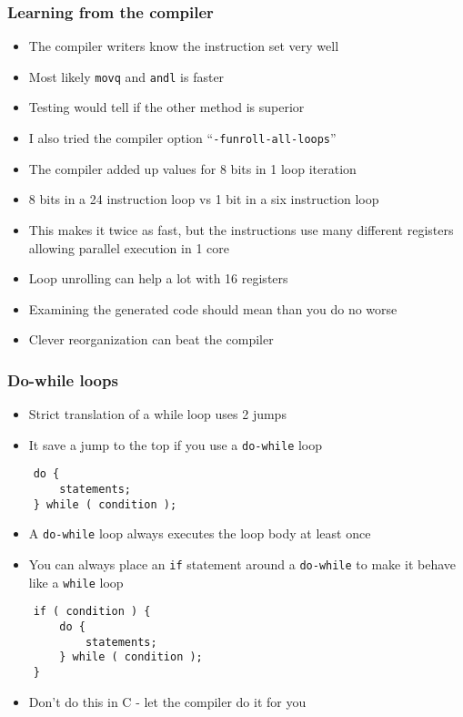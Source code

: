 \documentclass{beamer}
\begin{document}
\begin{frame}
    \frametitle{Learning from the compiler}
    \begin{itemize}
        \item The compiler writers know the instruction set very well
        \item Most likely {\tt movq} and {\tt andl} is faster
        \item Testing would tell if the other method is superior
        \item I also tried the compiler option ``{\tt -funroll-all-loops}''
        \item The compiler added up values for 8 bits in 1 loop iteration
        \item 8 bits in a 24 instruction loop vs 1 bit in a six instruction
              loop
        \item This makes it twice as fast, but the instructions use many
              different registers allowing parallel execution in 1 core
        \item Loop unrolling can help a lot with 16 registers
        \item Examining the generated code should mean than you do no worse
        \item Clever reorganization can beat the compiler
    \end{itemize}
\end{frame}

\begin{frame}[fragile]
    \frametitle{Do-while loops}
    \begin{itemize}
        \item Strict translation of a while loop uses 2 jumps
        \item It save a jump to the top if you use a {\tt do-while} loop
    \end{itemize}
\begin{verbatim}
    do {
        statements;
    } while ( condition );
\end{verbatim}
    \begin{itemize}
        \item A {\tt do-while} loop always executes the loop body at least
              once
        \item You can always place an {\tt if} statement around a 
              {\tt do-while} to make it behave like a {\tt while} loop
    \end{itemize}

\begin{verbatim}
    if ( condition ) {
        do {
            statements;
        } while ( condition );
    }
\end{verbatim}
    \begin{itemize}
        \item Don't do this in C - let the compiler do it for you
    \end{itemize}
\end{frame}
\end{document}

